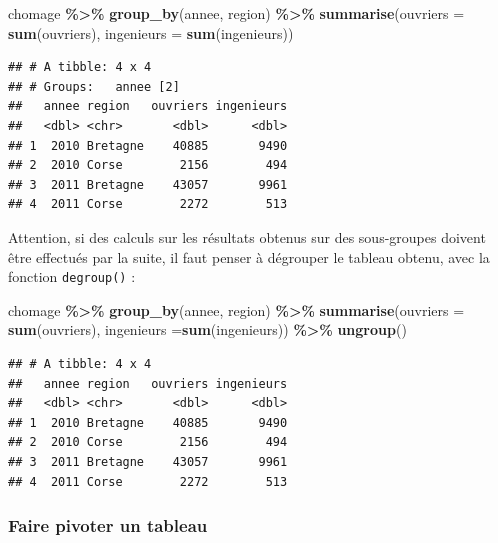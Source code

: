 \documentclass[
  11pt,
]{book}
\newenvironment{Shaded}{\begin{snugshade}}{\end{snugshade}}
\newcommand{\DataTypeTok}[1]{\textcolor[rgb]{0.13,0.29,0.53}{#1}}
\newcommand{\KeywordTok}[1]{\textcolor[rgb]{0.13,0.29,0.53}{\textbf{#1}}}
\newcommand{\NormalTok}[1]{#1}
\newcommand{\OperatorTok}[1]{\textcolor[rgb]{0.81,0.36,0.00}{\textbf{#1}}}
\newcommand{\StringTok}[1]{\textcolor[rgb]{0.31,0.60,0.02}{#1}}
\numberwithin{equation}{section}
\numberwithin{countremarque}{section}
\begin{document}
\begin{Shaded}
\begin{Highlighting}[]
\NormalTok{chomage }\OperatorTok{\%\textgreater{}\%}\StringTok{ }
\StringTok{  }\KeywordTok{group\_by}\NormalTok{(annee, region) }\OperatorTok{\%\textgreater{}\%}\StringTok{ }
\StringTok{  }\KeywordTok{summarise}\NormalTok{(}\DataTypeTok{ouvriers =} \KeywordTok{sum}\NormalTok{(ouvriers),}
            \DataTypeTok{ingenieurs =} \KeywordTok{sum}\NormalTok{(ingenieurs))}
\end{Highlighting}
\end{Shaded}

\begin{lstlisting}
## # A tibble: 4 x 4
## # Groups:   annee [2]
##   annee region   ouvriers ingenieurs
##   <dbl> <chr>       <dbl>      <dbl>
## 1  2010 Bretagne    40885       9490
## 2  2010 Corse        2156        494
## 3  2011 Bretagne    43057       9961
## 4  2011 Corse        2272        513
\end{lstlisting}

Attention, si des calculs sur les résultats obtenus sur des sous-groupes doivent être effectués par la suite, il faut penser à dégrouper le tableau obtenu, avec la fonction \texttt{degroup()} :

\begin{Shaded}
\begin{Highlighting}[]
\NormalTok{chomage }\OperatorTok{\%\textgreater{}\%}
\StringTok{  }\KeywordTok{group\_by}\NormalTok{(annee, region) }\OperatorTok{\%\textgreater{}\%}
\StringTok{  }\KeywordTok{summarise}\NormalTok{(}\DataTypeTok{ouvriers =} \KeywordTok{sum}\NormalTok{(ouvriers),}
            \DataTypeTok{ingenieurs =}\KeywordTok{sum}\NormalTok{(ingenieurs)) }\OperatorTok{\%\textgreater{}\%}\StringTok{ }
\StringTok{  }\KeywordTok{ungroup}\NormalTok{()}
\end{Highlighting}
\end{Shaded}

\begin{lstlisting}
## # A tibble: 4 x 4
##   annee region   ouvriers ingenieurs
##   <dbl> <chr>       <dbl>      <dbl>
## 1  2010 Bretagne    40885       9490
## 2  2010 Corse        2156        494
## 3  2011 Bretagne    43057       9961
## 4  2011 Corse        2272        513
\end{lstlisting}

\hypertarget{faire-pivoter-un-tableau}{%
\subsubsection{Faire pivoter un tableau}\label{faire-pivoter-un-tableau}}
\end{document}
